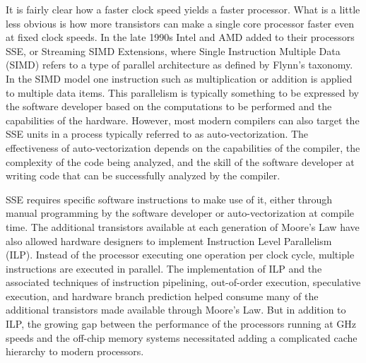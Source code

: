 \documentclass[preprint,sort&compress]{elsarticle}
\begin{document}
It is fairly clear how a faster clock speed yields a faster processor.  What is a little less obvious is how more transistors can make a single core processor faster even at fixed clock speeds.  In the late 1990s Intel and AMD added to their processors SSE, or Streaming SIMD Extensions, where Single Instruction Multiple Data (SIMD)
refers to a type of parallel architecture as defined by Flynn's taxonomy.  In the SIMD  model one instruction such as multiplication or addition is applied to multiple data items.  This parallelism is typically something to be expressed by the software developer based on the computations to be performed and the capabilities of the hardware.  However, most modern compilers can also target the SSE units in a process typically referred to as auto-vectorization.  The effectiveness of auto-vectorization depends on the capabilities of the compiler, the complexity of the code being analyzed, and the skill of the software developer at writing code that can be successfully analyzed by the compiler.

SSE requires specific software instructions to make use of it, either through manual programming by the software developer or auto-vectorization at compile time.  The additional transistors available at each generation of Moore's Law have also allowed hardware designers to implement Instruction Level Parallelism (ILP).  Instead of the processor executing one operation per clock cycle, multiple instructions are executed in parallel. The implementation of ILP and the associated techniques of instruction pipelining, out-of-order execution, speculative execution, and hardware branch prediction helped consume many of the additional transistors made available through Moore's Law.  But in addition to ILP, the growing gap between the performance of the processors running at GHz speeds and the off-chip memory systems necessitated adding a complicated cache hierarchy to modern processors.
\end{document}
